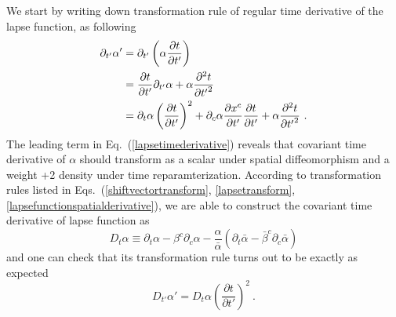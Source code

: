 We start by writing down transformation rule of regular time derivative of the lapse function, as following
\begin{align}\label{lapsetimederivative}
\partial_{t'}\alpha' & = \partial_{t'}\left(\alpha\frac{\partial t}{\partial t'}\right)\notag\\
& = \frac{\partial t}{\partial t'}\partial_{t'}\alpha + \alpha\frac{\partial^{2}t}{\partial {t'}^{2}}\notag\\
& = \partial_{t}\alpha\left(\frac{\partial t}{\partial t'}\right)^{2} + \partial_{c}\alpha\frac{\partial x^{c}}{\partial t'}\frac{\partial t}{\partial t'} + \alpha\frac{\partial^{2}t}{\partial {t'}^{2}} \ .
\end{align}
The leading term in Eq.~(\ref{lapsetimederivative}) reveals that covariant time derivative of $\alpha$ should transform as a scalar under spatial diffeomorphism and a weight +2 density under time reparamterization. According to transformation rules listed in Eqs.~(\ref{shiftvectortransform}, \ref{lapsetransform}, \ref{lapsefunctionspatialderivative}), we are able to construct the covariant time derivative of lapse function as
\begin{equation}
	D_{t}\alpha \equiv \partial_{t}\alpha - \beta^{c}\partial_{c}\alpha - \frac{\alpha}{{\bar \alpha}}\left(\partial_{t}{\bar \alpha} - {\bar \beta}^{c}\partial_{c}{\bar \alpha}\right) 
\end{equation}
and one can check that its transformation rule turns out to be exactly as expected
\begin{equation}
	D_{t'}\alpha' = D_{t}\alpha \left(\frac{\partial t}{\partial t'}\right)^{2} \ .
\end{equation}

